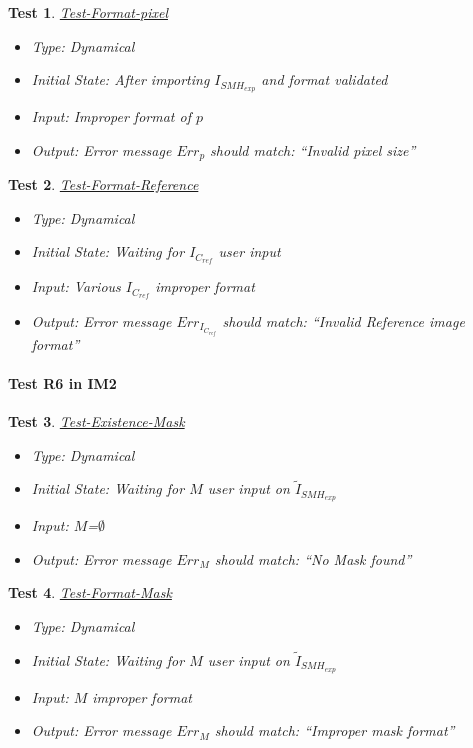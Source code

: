 \documentclass[12pt, titlepage]{article}
\newtheorem{Test}{Test}
\begin{document}
\begin{Test}\normalfont\underline{Test-Format-pixel}
\begin{itemize}
\item Type: Dynamical
\item Initial State: After importing $I_{SMH_{exp}}$ and format validated
\item Input: Improper format of $p$
\item Output: Error message $Err_{p}$ should match: \enquote{Invalid pixel size}
\end{itemize}
\end{Test}


\begin{Test}\normalfont\underline{Test-Format-Reference}
\begin{itemize}
\item Type: Dynamical
\item Initial State: Waiting for $I_{C_{ref}}$ user input
\item Input: Various $I_{C_{ref}}$ improper format
\item Output: Error message $Err_{I_{C_{ref}}}$ should match: \enquote{Invalid Reference image format}
\end{itemize}
\end{Test}

\paragraph{Test R6 in IM2}

\begin{Test}\normalfont\underline{Test-Existence-Mask}
\begin{itemize}
\item Type: Dynamical
\item Initial State: Waiting for $M$ user input on $\widetilde{I}_{SMH_{exp}}$
\item Input: $M$=$\emptyset$
\item Output:  Error message $Err_{M}$ should match: \enquote{No Mask found}
\end{itemize}
\end{Test}

\begin{Test}\normalfont\underline{Test-Format-Mask}
\begin{itemize}
\item Type: Dynamical
\item Initial State: Waiting for $M$ user input on $\widetilde{I}_{SMH_{exp}}$
\item Input: $M$ improper format
\item Output:  Error message $Err_{M}$ should match: \enquote{Improper mask format}
\end{itemize}
\end{Test}
\end{document}
